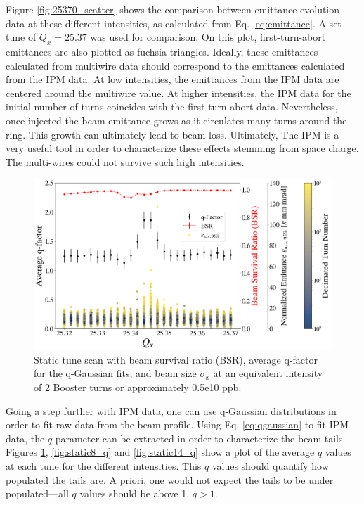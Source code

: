 Figure \ref{fig:25370_scatter} shows the comparison between emittance evolution data at these different intensities, as calculated from Eq. \ref{eq:emittance}. A set tune of $Q_x=25.37$ was used for comparison. On this plot, first-turn-abort emittances are also plotted as fuchsia triangles. Ideally, these emittances calculated from multiwire data should correspond to the emittances calculated from the IPM data. At low intensities, the emittances from the IPM data are centered around the multiwire value. At higher intensities, the IPM data for the initial number of turns coincides with the first-turn-abort data. Nevertheless, once injected the beam emittance grows as it circulates many turns around the ring. This growth can ultimately lead to beam loss. Ultimately, The IPM is a very useful tool in order to characterize these effects stemming from space charge. The multi-wires could not survive such high intensities. 

\begin{figure}[H]
    \centering
    \includegraphics[width=\columnwidth]{chapter6/static2turns_emittance_dampersOFF.png}
    \caption{Static tune scan with beam survival ratio (BSR), average q-factor for the q-Gaussian fits, and beam size $\sigma_x$ at an equivalent intensity of 2 Booster turns or approximately 0.5e10 ppb.}
    \label{fig:static2_q}
\end{figure}

Going a step further with IPM data, one can use q-Gaussian distributions in order to fit raw data from the beam profile. Using Eq. \ref{eq:qgaussian} to fit IPM data, the $q$ parameter can be extracted in order to characterize the beam tails. Figures \ref{fig:static2_q}, \ref{fig:static8_q} and \ref{fig:static14_q} show a plot of the average $q$ values at each tune for the different intensities. This $q$ values should quantify how populated the tails are. A priori, one would not expect the tails to be under populated---all $q$ values should be above 1, $q>1$.

